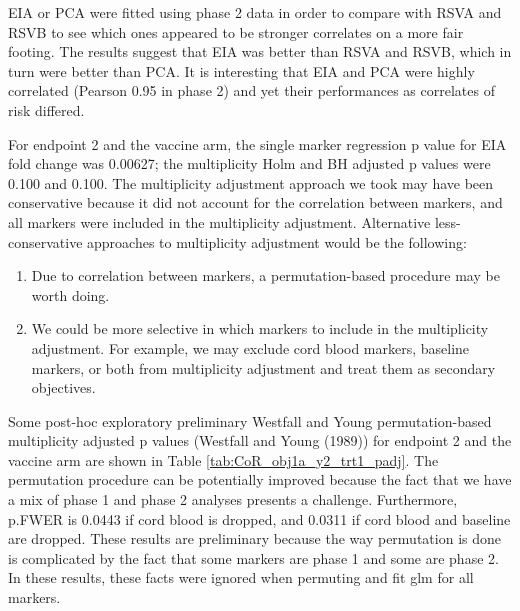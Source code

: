 \documentclass[11pt]{article}
\providecommand{\tightlist}{%
   \setlength{\itemsep}{0pt}\setlength{\parskip}{0pt}}
\begin{document}
EIA or PCA were fitted using phase 2 data in order to compare with RSVA and RSVB to see which ones appeared to be stronger correlates on a more fair footing. The results suggest that EIA was better than RSVA and RSVB, which in turn were better than PCA. It is interesting that EIA and PCA were highly correlated (Pearson 0.95 in phase 2) and yet their performances as correlates of risk differed.
\bigskip

For endpoint 2 and the vaccine arm, the single marker regression p value for EIA fold change was 0.00627; the multiplicity Holm and BH adjusted p values were 0.100 and 0.100.
The multiplicity adjustment approach we took may have been conservative because it did not account for the correlation between markers, and all markers were included in the multiplicity adjustment. Alternative less-conservative approaches to multiplicity adjustment would be the following:

\begin{enumerate}
\def\labelenumi{\arabic{enumi})}
\tightlist
\item
  Due to correlation between markers, a permutation-based procedure may be worth doing.
\item
  We could be more selective in which markers to include in the multiplicity adjustment. For example, we may exclude cord blood markers, baseline markers, or both from multiplicity adjustment and treat them as secondary objectives.
\end{enumerate}

Some post-hoc exploratory preliminary Westfall and Young permutation-based multiplicity adjusted p values (Westfall and Young (1989)) for endpoint 2 and the vaccine arm are shown in Table \ref{tab:CoR_obj1a_y2_trt1_padj}. The permutation procedure can be potentially improved because the fact that we have a mix of phase 1 and phase 2 analyses presents a challenge. Furthermore, p.FWER is 0.0443 if cord blood is dropped, and 0.0311 if cord blood and baseline are dropped. These results are preliminary because the way permutation is done is complicated by the fact that some markers are phase 1 and some are phase 2. In these results, these facts were ignored when permuting and fit glm for all markers.
\end{document}

